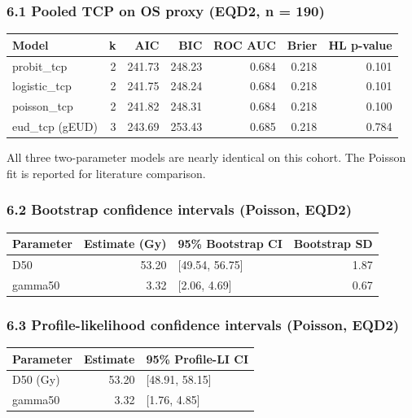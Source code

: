 \documentclass[
  11pt,
]{article}
\begin{document}
\subsubsection{6.1 Pooled TCP on OS proxy (EQD2, n =
190)}\label{pooled-tcp-on-os-proxy-eqd2-n-190}

\begin{longtable}[]{@{}lrrrrrr@{}}
\toprule\noalign{}
Model & k & AIC & BIC & ROC AUC & Brier & HL p-value \\
\midrule\noalign{}
\endhead
\bottomrule\noalign{}
\endlastfoot
probit\_tcp & 2 & 241.73 & 248.23 & 0.684 & 0.218 & 0.101 \\
logistic\_tcp & 2 & 241.75 & 248.24 & 0.684 & 0.218 & 0.101 \\
poisson\_tcp & 2 & 241.82 & 248.31 & 0.684 & 0.218 & 0.100 \\
eud\_tcp (gEUD) & 3 & 243.69 & 253.43 & 0.685 & 0.218 & 0.784 \\
\end{longtable}

All three two-parameter models are nearly identical on this cohort. The
Poisson fit is reported for literature comparison.

\subsubsection{6.2 Bootstrap confidence intervals (Poisson,
EQD2)}\label{bootstrap-confidence-intervals-poisson-eqd2}

\begin{longtable}[]{@{}lrlr@{}}
\toprule\noalign{}
Parameter & Estimate (Gy) & 95\% Bootstrap CI & Bootstrap SD \\
\midrule\noalign{}
\endhead
\bottomrule\noalign{}
\endlastfoot
D50 & 53.20 & {[}49.54, 56.75{]} & 1.87 \\
gamma50 & 3.32 & {[}2.06, 4.69{]} & 0.67 \\
\end{longtable}

\subsubsection{6.3 Profile-likelihood confidence intervals (Poisson,
EQD2)}\label{profile-likelihood-confidence-intervals-poisson-eqd2}

\begin{longtable}[]{@{}lrl@{}}
\toprule\noalign{}
Parameter & Estimate & 95\% Profile-LI CI \\
\midrule\noalign{}
\endhead
\bottomrule\noalign{}
\endlastfoot
D50 (Gy) & 53.20 & {[}48.91, 58.15{]} \\
gamma50 & 3.32 & {[}1.76, 4.85{]} \\
\end{longtable}
\end{document}
